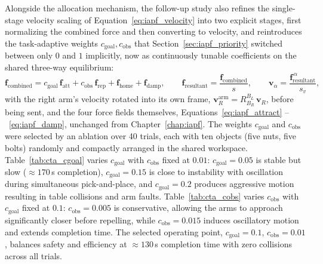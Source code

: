 Alongside the allocation mechanism, the follow-up study also refines the single-stage velocity
scaling of Equation~\eqref{eq:iapf_velocity} into two explicit stages, first normalizing the combined
force and then converting to velocity, and reintroduces the task-adaptive weights
$c_{\text{goal}}, c_{\text{obs}}$ that Section~\ref{sec:iapf_priority} switched between only $0$ and
$1$ implicitly, now as continuously tunable coefficients on the shared three-way equilibrium:
\begin{equation}
\mathbf{f}_{\text{combined}} = c_{\text{goal}}\, \mathbf{f}_{\text{att}} + c_{\text{obs}}\, \mathbf{f}_{\text{rep}}
+ \mathbf{f}_{\text{home}} + \mathbf{f}_{\text{damp}}, \qquad
\mathbf{f}_{\text{resultant}} = \frac{\mathbf{f}_{\text{combined}}}{s}, \qquad
\mathbf{v}_\alpha = \frac{\mathbf{f}_{\text{resultant}}^{\,\alpha}}{s_v},
\label{eq:cta_velocity}
\end{equation}
with the right arm's velocity rotated into its own frame, $\mathbf{v}_R^{\text{arm}} = R^{B_L}_{B_R}\, \mathbf{v}_R$,
before being sent, and the four force fields themselves, Equations~\eqref{eq:iapf_attract}
--~\eqref{eq:iapf_damp}, unchanged from Chapter~\ref{chap:iapf}. The weights $c_{\text{goal}}$ and
$c_{\text{obs}}$ were selected by an ablation over 40 trials, each with ten objects (five nuts, five
bolts) randomly and compactly arranged in the shared workspace. Table~\ref{tab:cta_cgoal} varies
$c_{\text{goal}}$ with $c_{\text{obs}}$ fixed at $0.01$: $c_{\text{goal}} = 0.05$ is stable but slow
($\approx 170$\,s completion), $c_{\text{goal}} = 0.15$ is close to instability with oscillation
during simultaneous pick-and-place, and $c_{\text{goal}} = 0.2$ produces aggressive motion resulting
in table collisions and arm faults. Table~\ref{tab:cta_cobs} varies $c_{\text{obs}}$ with
$c_{\text{goal}}$ fixed at $0.1$: $c_{\text{obs}} = 0.005$ is conservative, allowing the arms to
approach significantly closer before repelling, while $c_{\text{obs}} = 0.015$ induces oscillatory
motion and extends completion time. The selected operating point, $c_{\text{goal}} = 0.1$,
$c_{\text{obs}} = 0.01$, balances safety and efficiency at $\approx 130$\,s completion time with zero
collisions across all trials.

